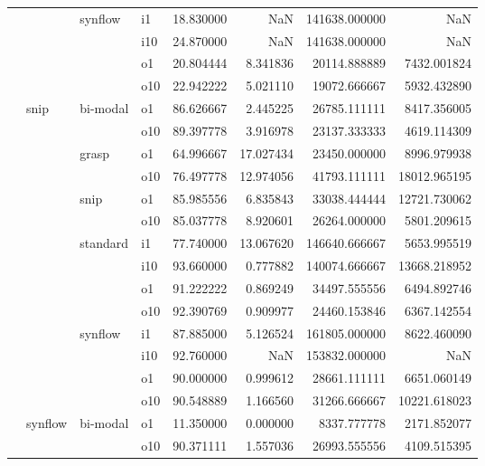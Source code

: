 \begin{longtable}{llllrrrr}
      &     & synflow & i1 &  18.830000 &        NaN &    141638.000000 &           NaN \\
      &     &         & i10 &  24.870000 &        NaN &    141638.000000 &           NaN \\
      &     &         & o1 &  20.804444 &   8.341836 &     20114.888889 &   7432.001824 \\
      &     &         & o10 &  22.942222 &   5.021110 &     19072.666667 &   5932.432890 \\
      & snip & bi-modal & o1 &  86.626667 &   2.445225 &     26785.111111 &   8417.356005 \\
      &     &         & o10 &  89.397778 &   3.916978 &     23137.333333 &   4619.114309 \\
      &     & grasp & o1 &  64.996667 &  17.027434 &     23450.000000 &   8996.979938 \\
      &     &         & o10 &  76.497778 &  12.974056 &     41793.111111 &  18012.965195 \\
      &     & snip & o1 &  85.985556 &   6.835843 &     33038.444444 &  12721.730062 \\
      &     &         & o10 &  85.037778 &   8.920601 &     26264.000000 &   5801.209615 \\
      &     & standard & i1 &  77.740000 &  13.067620 &    146640.666667 &   5653.995519 \\
      &     &         & i10 &  93.660000 &   0.777882 &    140074.666667 &  13668.218952 \\
      &     &         & o1 &  91.222222 &   0.869249 &     34497.555556 &   6494.892746 \\
      &     &         & o10 &  92.390769 &   0.909977 &     24460.153846 &   6367.142554 \\
      &     & synflow & i1 &  87.885000 &   5.126524 &    161805.000000 &   8622.460090 \\
      &     &         & i10 &  92.760000 &        NaN &    153832.000000 &           NaN \\
      &     &         & o1 &  90.000000 &   0.999612 &     28661.111111 &   6651.060149 \\
      &     &         & o10 &  90.548889 &   1.166560 &     31266.666667 &  10221.618023 \\
      & synflow & bi-modal & o1 &  11.350000 &   0.000000 &      8337.777778 &   2171.852077 \\
      &     &         & o10 &  90.371111 &   1.557036 &     26993.555556 &   4109.515395 \\

\end{longtable}

